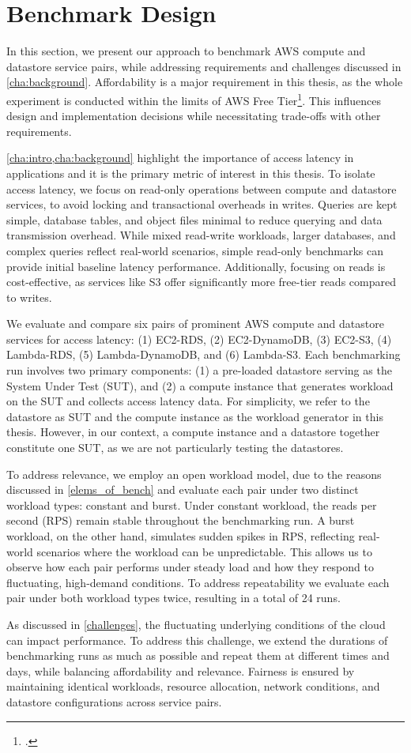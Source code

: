 \section{Benchmark Design}
\label{cha:approach}

In this section, we present our approach to benchmark AWS compute and datastore service pairs, while addressing requirements and challenges discussed in \cref{cha:background}. Affordability is a major requirement in this thesis, as the whole experiment is conducted within the limits of AWS Free Tier\footcite{https://aws.amazon.com/free/}. This influences design and implementation decisions while necessitating trade-offs with other requirements.

\cref{cha:intro,cha:background} highlight the importance of access latency in applications and it is the primary metric of interest in this thesis. To isolate access latency, we focus on read-only operations between compute and datastore services, to avoid locking and transactional overheads in writes. Queries are kept simple, database tables, and object files minimal to reduce querying and data transmission overhead. While mixed read-write workloads, larger databases, and complex queries reflect real-world scenarios, simple read-only benchmarks can provide initial baseline latency performance. Additionally, focusing on reads is cost-effective, as services like S3 offer significantly more free-tier reads compared to writes.

We evaluate and compare six pairs of prominent AWS compute and datastore services for access latency: (1) EC2-RDS, (2) EC2-DynamoDB, (3) EC2-S3, (4) Lambda-RDS, (5) Lambda-DynamoDB, and (6) Lambda-S3. Each benchmarking run involves two primary components: (1) a pre-loaded datastore serving as the System Under Test (SUT), and (2) a compute instance that generates workload on the SUT and collects access latency data. For simplicity, we refer to the datastore as SUT and the compute instance as the workload generator in this thesis. However, in our context, a compute instance and a datastore together constitute one SUT, as we are not particularly testing the datastores.

To address relevance, we employ an open workload model, due to the reasons discussed in \cref{elems_of_bench} and evaluate each pair under two distinct workload types: constant and burst. Under constant workload, the reads per second (RPS) remain stable throughout the benchmarking run. A burst workload, on the other hand, simulates sudden spikes in RPS, reflecting real-world scenarios where the workload can be unpredictable. This allows us to observe how each pair performs under steady load and how they respond to fluctuating, high-demand conditions. To address repeatability we evaluate each pair under both workload types twice, resulting in a total of 24 runs.

As discussed in \cref{challenges}, the fluctuating underlying conditions of the cloud can impact performance. To address this challenge, we extend the durations of benchmarking runs as much as possible and repeat them at different times and days, while balancing affordability and relevance. Fairness is ensured by maintaining identical workloads, resource allocation, network conditions, and datastore configurations across service pairs.
